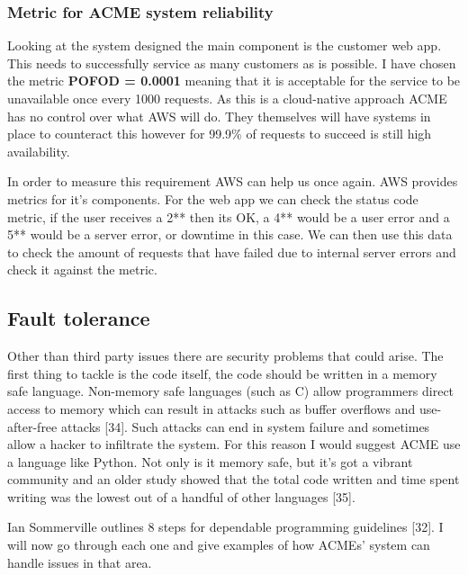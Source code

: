   \subsubsection{Metric for ACME system reliability}

  Looking at the system designed the main component is the customer web app. This needs to successfully service as many customers as is possible.
  I have chosen the metric \textbf{POFOD = 0.0001} meaning that it is acceptable for the service to be unavailable once every 1000 requests. As this is a 
  cloud-native approach ACME has no control over what AWS will do. They themselves will have systems in place to counteract this however for 99.9\% of
  requests to succeed is still high availability.

  In order to measure this requirement AWS can help us once again. AWS provides metrics for it's components. For the web app we can check the status code
  metric, if the user receives a 2** then its OK, a 4** would be a user error and a 5** would be a server error, or downtime in this case. We can 
  then use this data to check the amount of requests that have failed due to internal server errors and check it against the metric.

  \subsection{Fault tolerance}
  Other than third party issues there are security problems that could arise. The first thing to tackle is the code itself, the code should be written in 
  a memory safe language. Non-memory safe languages (such as C) allow programmers direct access to memory which can result in attacks such as buffer
  overflows and use-after-free attacks [34]. Such attacks can end in system failure and sometimes allow a hacker to infiltrate the system. For this 
  reason I would suggest ACME use a language like Python. Not only is it memory safe, but it's got a vibrant community and an older study showed
  that the total code written and time spent writing was the lowest out of a handful of other languages [35].

  Ian Sommerville outlines 8 steps for dependable programming guidelines [32]. I will now go through each one and give examples of how ACMEs' system can 
  handle issues in that area.

